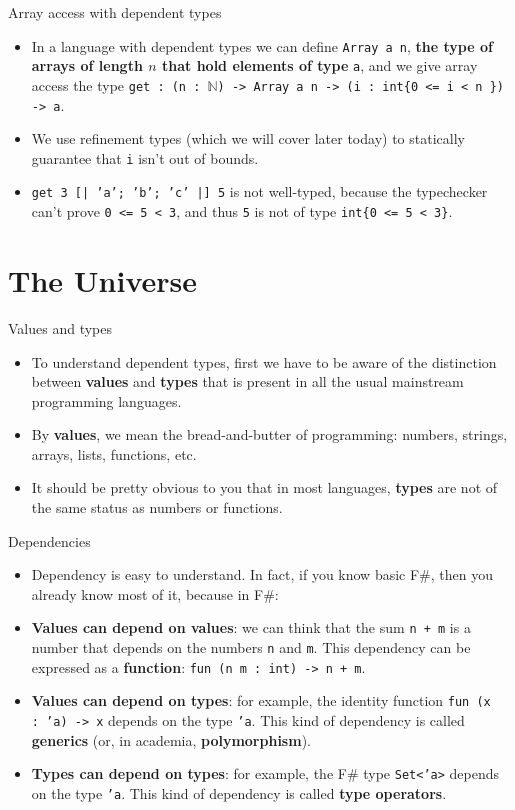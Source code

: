 \documentclass{beamer}
\newcommand{\m}[1]{\texttt{#1}}
\begin{document}
\begin{frame}{Array access with dependent types}
\begin{itemize}
	\item In a language with dependent types we can define \m{Array a n}, \textbf{the type of arrays of length $n$ that hold elements of type} \m{a}, and we give array access the type \m{get :\ (n :\ $\mathbb{N}$) -> Array a n -> (i :\ int\{0 <= i < n \}) -> a}.
	\item We use refinement types (which we will cover later today) to statically guarantee that \m{i} isn't out of bounds.
	\item \m{get 3 [| 'a'; 'b'; 'c' |] 5} is not well-typed, because the typechecker can't prove \m{0 <= 5 < 3}, and thus \m{5} is not of type \m{int\{0 <= 5 < 3\}}.
\end{itemize}
\end{frame}

\section{The Universe}

\begin{frame}{Values and types}
\begin{itemize}
	\item To understand dependent types, first we have to be aware of the distinction between \textbf{values} and \textbf{types} that is present in all the usual mainstream programming languages.
	\item By \textbf{values}, we mean the bread-and-butter of programming: numbers, strings, arrays, lists, functions, etc.
	\item It should be pretty obvious to you that in most languages, \textbf{types} are not of the same status as numbers or functions.
\end{itemize}
\end{frame}

\begin{frame}{Dependencies}
\begin{itemize}
	\item Dependency is easy to understand. In fact, if you know basic F\#, then you already know most of it, because in F\#:
	\item \textbf{Values can depend on values}: we can think that the sum \m{n + m} is a number that depends on the numbers \m{n} and \m{m}. This dependency can be expressed as a \textbf{function}: \m{fun (n m :\ int) -> n + m}.
	\item \textbf{Values can depend on types}: for example, the identity function \m{fun (x :\ 'a) -> x} depends on the type \m{'a}. This kind of dependency is called \textbf{generics} (or, in academia, \textbf{polymorphism}).
	\item \textbf{Types can depend on types}: for example, the F\# type \m{Set<'a>} depends on the type \m{'a}. This kind of dependency is called \textbf{type operators}.
\end{itemize}
\end{frame}
\end{document}
